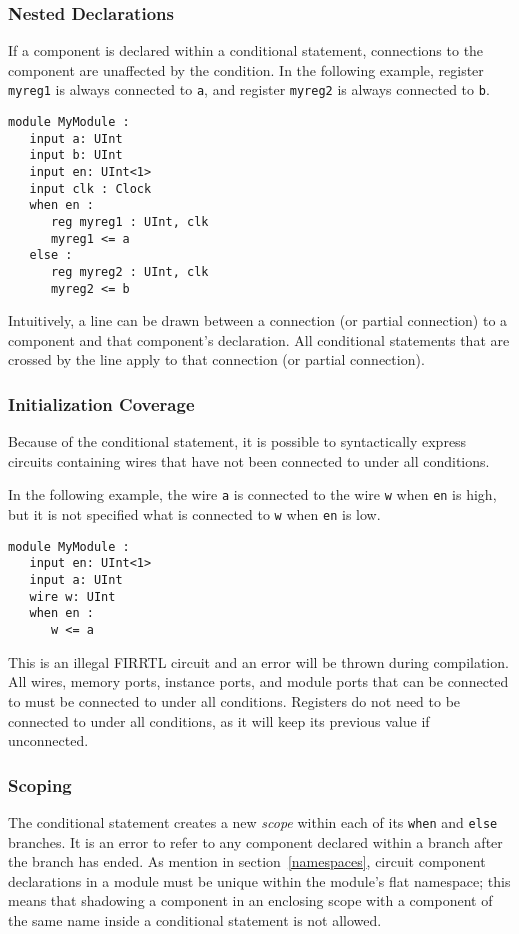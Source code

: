 \documentclass[12pt]{article}
\begin{document}
\subsubsection{Nested Declarations}
If a component is declared within a conditional statement, connections to the component are unaffected by the condition. In the following example, register \verb|myreg1| is always connected to \verb|a|, and register \verb|myreg2| is always connected to \verb|b|.

\begin{lstlisting}
module MyModule :
   input a: UInt
   input b: UInt
   input en: UInt<1>
   input clk : Clock
   when en :
      reg myreg1 : UInt, clk
      myreg1 <= a
   else :
      reg myreg2 : UInt, clk
      myreg2 <= b
\end{lstlisting}

Intuitively, a line can be drawn between a connection (or partial connection) to a component and that component's declaration. All conditional statements that are crossed by the line apply to that connection (or partial connection).

\subsubsection{Initialization Coverage}
Because of the conditional statement, it is possible to syntactically express circuits containing wires that have not been connected to under all conditions.

In the following example, the wire \verb|a| is connected to the wire \verb|w| when \verb|en| is high, but it is not specified what is connected to \verb|w| when \verb|en| is low.

\begin{lstlisting}
module MyModule :
   input en: UInt<1>
   input a: UInt
   wire w: UInt
   when en :
      w <= a
\end{lstlisting}

This is an illegal FIRRTL circuit and an error will be thrown during compilation. All wires, memory ports, instance ports, and module ports that can be connected to must be connected to under all conditions. Registers do not need to be connected to under all conditions, as it will keep its previous value if unconnected.

\subsubsection{Scoping}
The conditional statement creates a new {\em scope} within each of its \verb|when| and \verb|else| branches. It is an error to refer to any component declared within a branch after the branch has ended. As mention in section~\ref{namespaces}, circuit component declarations in a module must be unique within the module's flat namespace; this means that shadowing a component in an enclosing scope with a component of the same name inside a conditional statement is not allowed.
\end{document}

